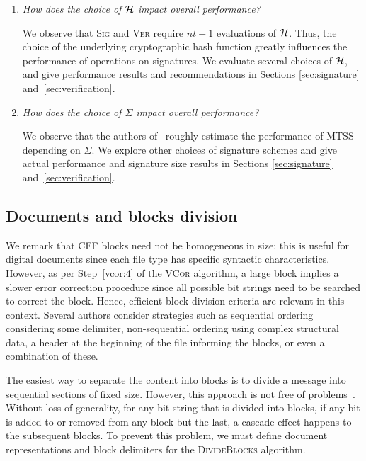 \documentclass[12pt]{article}
\begin{document}
\begin{enumerate}[label=$\mathbf{Q_{\arabic*}}$, itemsep=.5em, wide, labelindent=0pt, listparindent=0pt]
  \item\label{question:hash-choice}

  \emph{How does the choice of $\mathcal{H}$ impact overall performance?}

  \vspace{.5em}
  We observe that \textsc{Sig} and \textsc{Ver} require $nt + 1$ evaluations of $\mathcal{H}$. Thus, the choice of the underlying cryptographic hash function greatly influences the performance of operations on signatures. We evaluate several choices of $\mathcal{H}$, and give performance results and recommendations in Sections \ref{sec:signature} and~\ref{sec:verification}.

  \item\label{question:sigma-choice}

  \textit{How does the choice of $\Sigma$ impact overall performance?}

  \vspace{.5em}
  We observe that the authors of~\cite{mtss-idalino-2019} roughly estimate the performance of MTSS depending on $\Sigma$. We explore other choices of signature schemes and give actual performance and signature size results in Sections \ref{sec:signature} and~\ref{sec:verification}.
\end{enumerate}

\subsection{Documents and blocks division}
\label{sec:documents-blocks-distribution}

We remark that CFF blocks need not be homogeneous in size; this is useful for digital documents since each file type has specific syntactic characteristics. However, as per Step~\ref{vcor:4} of the \textsc{VCor} algorithm, a large block implies a slower error correction procedure since all possible bit strings need to be searched to correct the block. Hence, efficient block division criteria are relevant in this context. Several authors \cite{mtss-idalino-2019, different-data-structures-pohls-2018} consider strategies such as sequential ordering considering some delimiter, non-sequential ordering using complex structural data, a header at the beginning of the file informing the blocks, or even a combination of these.

The easiest way to separate the content into blocks is to divide a message into sequential sections of fixed size. However, this approach is not free of problems~\cite{mlss-idalino-2015}. Without loss of generality, for any bit string that is divided into blocks, if any bit is added to or removed from any block but the last, a cascade effect happens to the subsequent blocks. To prevent this problem, we must define document representations and block delimiters for the \textsc{DivideBlocks} algorithm. 
\end{document}
